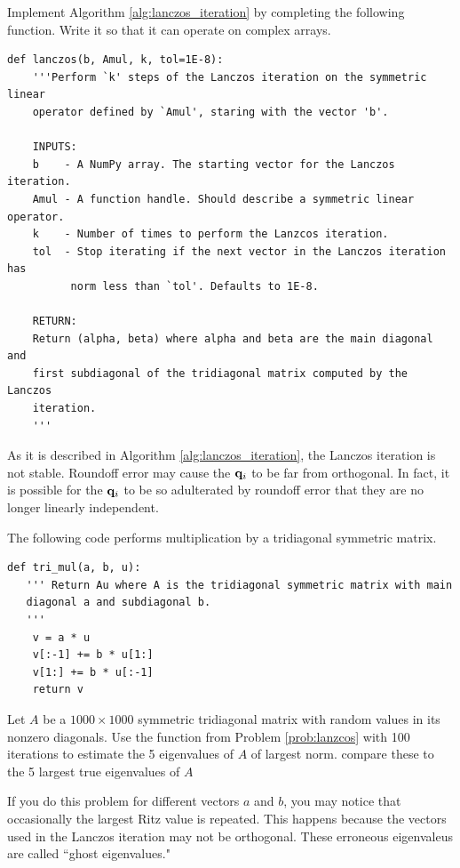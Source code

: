 \begin{problem}
\label{prob:lanczos}
Implement Algorithm \ref{alg:lanczos_iteration} by completing the following function.
Write it so that it can operate on complex arrays.
\begin{lstlisting}
def lanczos(b, Amul, k, tol=1E-8):
    '''Perform `k' steps of the Lanczos iteration on the symmetric linear 
    operator defined by `Amul', staring with the vector 'b'.
    
    INPUTS:
    b    - A NumPy array. The starting vector for the Lanczos iteration.
    Amul - A function handle. Should describe a symmetric linear operator.
    k    - Number of times to perform the Lanzcos iteration.
    tol  - Stop iterating if the next vector in the Lanczos iteration has 
          norm less than `tol'. Defaults to 1E-8.
    
    RETURN:
    Return (alpha, beta) where alpha and beta are the main diagonal and 
    first subdiagonal of the tridiagonal matrix computed by the Lanczos 
    iteration.
    '''
\end{lstlisting}
\end{problem}

As it is described in Algorithm \ref{alg:lanczos_iteration}, the Lanczos iteration is not stable.
Roundoff error may cause the ${\bf q}_i$ to be far from orthogonal.
In fact, it is possible for the ${\bf q}_i$ to be so adulterated by roundoff error that they are no longer linearly independent.

\begin{problem}
The following code performs multiplication by a tridiagonal symmetric matrix.

\begin{lstlisting}
def tri_mul(a, b, u):
   ''' Return Au where A is the tridiagonal symmetric matrix with main
   diagonal a and subdiagonal b.
   '''
    v = a * u
    v[:-1] += b * u[1:]
    v[1:] += b * u[:-1]
    return v
\end{lstlisting}

Let $A$ be a $1000\times 1000$ symmetric tridiagonal matrix with random values in its nonzero diagonals.
Use the function  from Problem \ref{prob:lanzcos} with 100 iterations to estimate the 5 eigenvalues of $A$ of largest norm.
compare these to the 5 largest true eigenvalues of $A$

If you do this problem for different vectors $a$ and $b$, you may notice that occasionally the largest Ritz value is repeated.
This happens because the vectors used in the Lanczos iteration may not be orthogonal.
These erroneous eigenvaleus are called ``ghost eigenvalues."
\end{problem}

